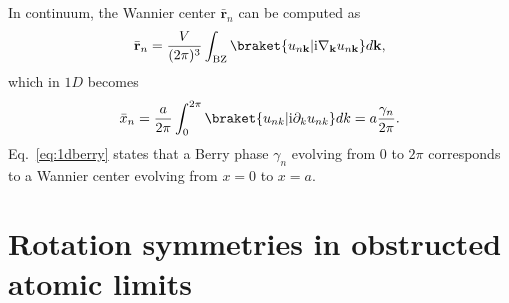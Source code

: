{In continuum, the Wannier center $\bar{\mathbf{r}}_n$ can be computed as 
\begin{equation}
\bar{\mathbf{r}}_n = \frac{V}{(2 \pi)^3} \int_{\mathrm{BZ}} \braket{u_{n \mathbf{k}} | \mathrm{i} \nabla_{\mathbf{k}} u_{n \mathbf{k}}} d \mathbf{k},
\end{equation}
which in $1D$ becomes
\begin{equation}
\bar{x}_n = \frac{a}{2 \pi} \int_0^{2 \pi} \braket{ u_{nk} | \mathrm{i} \partial_k u_{nk} } dk = a \frac{\gamma_n}{2 \pi}.
\label{eq:1dberry}
\end{equation}
Eq.~\eqref{eq:1dberry} states that a Berry phase $\gamma_n$ evolving from $0$ to $2 \pi$ corresponds to a Wannier center evolving from $x = 0$ to $x =a$.

\chapter{Rotation symmetries in obstructed atomic limits}
}
